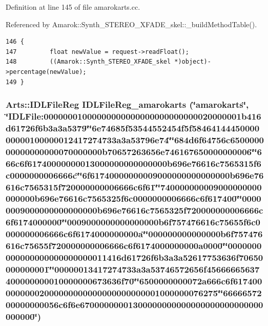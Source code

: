 Definition at line 145 of file amarokarts.cc.

Referenced by Amarok::Synth\_\-STEREO\_\-XFADE\_\-skel::\_\-build\-Method\-Table().



\footnotesize\begin{verbatim}146 {
147         float newValue = request->readFloat();
148         ((Amarok::Synth_STEREO_XFADE_skel *)object)->percentage(newValue);
149 }
\end{verbatim}\normalsize 
{}
\subsubsection{\setlength{\rightskip}{0pt plus 5cm}Arts::IDLFile\-Reg IDLFile\-Reg\_\-amarokarts (\char`\"{}amarokarts\char`\"{}, \char`\"{}IDLFile:00000001000000000000000000000000020000001b416d61726f6b3a3a5379\char`\"{}\char`\"{}6e74685f53544552454f5f5846414445000000000100000012417274733a3a53796e74\char`\"{}\char`\"{}684d6f64756c650000000000000000070000000b70657263656e746167650000000006\char`\"{}\char`\"{}666c6f61740000000013000000000000000b696e76616c7565315f6c0000000006666c\char`\"{}\char`\"{}6f61740000000009000000000000000b696e76616c7565315f720000000006666c6f61\char`\"{}\char`\"{}740000000009000000000000000b696e76616c7565325f6c0000000006666c6f617400\char`\"{}\char`\"{}00000009000000000000000b696e76616c7565325f720000000006666c6f6174000000\char`\"{}\char`\"{}0009000000000000000b6f757476616c75655f6c0000000006666c6f6174000000000a\char`\"{}\char`\"{}000000000000000b6f757476616c75655f720000000006666c6f6174000000000a0000\char`\"{}\char`\"{}0000000000000000000000000011416d61726f6b3a3a52617753636f70650000000001\char`\"{}\char`\"{}00000013417274733a3a53746572656f45666665637400000000010000000673636f70\char`\"{}\char`\"{}6500000000072a666c6f61740000000002000000000000000000000001000000076275\char`\"{}\char`\"{}6666657200000000056c6f6e67000000001300000000000000000000000000000000\char`\"{})\hspace{0.3cm}{\tt  [static]}}\label{amarokarts_8cc_a5}


